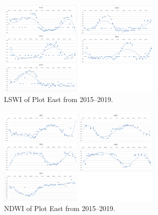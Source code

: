 \documentclass[a4paper, 10pt, conference]{ieeeconf}      %
\begin{document}
\begin{figure}[h]
\centering
\includegraphics[width=8cm]{Figures/LSWI_east.png}
\caption{LSWI of Plot East from 2015–2019.}
\label{fig:lswieast}
\end{figure}

\begin{figure}[h]
\centering
\includegraphics[width=8cm]{Figures/NDWI_east.png}
\caption{NDWI of Plot East from 2015–2019.}
\label{fig:ndwieast}
\end{figure}
\end{document}
